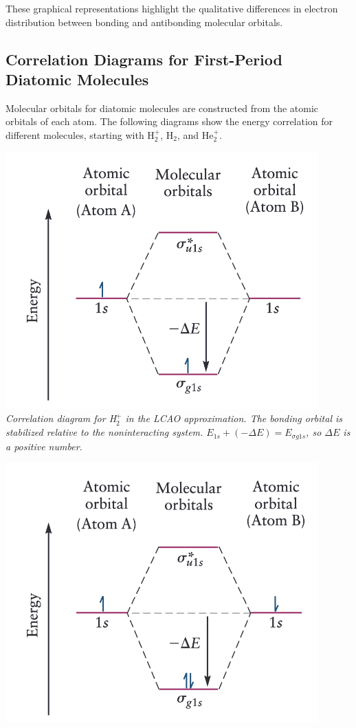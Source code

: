 \documentclass{report}
\begin{document}
These graphical representations highlight the qualitative differences in electron distribution between bonding and antibonding molecular orbitals.

\subsection{Correlation Diagrams for First-Period Diatomic Molecules}

Molecular orbitals for diatomic molecules are constructed from the atomic orbitals of each atom. The following diagrams show the energy correlation for different molecules, starting with H$_2^+$, H$_2$, and He$_2^+$.

\begin{center}
	\begin{minipage}{0.32\textwidth}
		\centering
		\includegraphics[width=0.9\textwidth]{5.1.png}
		\textit{Correlation diagram for H$_2^+$ in the LCAO approximation. The bonding orbital is stabilized relative to the noninteracting system. $E_{1s} + (-\Delta E) = E_{\sigma g1s}$, so $\Delta E$ is a positive number.}
	\end{minipage}
	\begin{minipage}{0.32\textwidth}
		\centering
		\includegraphics[width=0.9\textwidth]{5.2.png}

\end{minipage}
\end{center}
\end{document}
